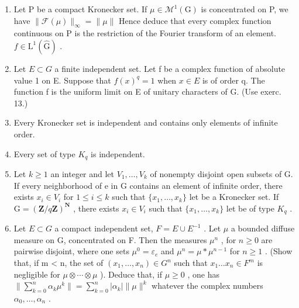 \begin{enumerate}
\def\labelenumi{\alph{enumi})}
\item
  Let P be a compact Kronecker set. If \(\mu \in \mathcal{M}^1 (\mathrm{G})\) is concentrated on P, we have \(\| \mathcal{F}(\mu)\|_{\infty} = \| \mu \|\) Hence deduce that every complex function continuous on P is the restriction of the Fourier transform of an element. \(f\in \mathrm{L}^{1}(\widehat{\mathrm{G}})\) .
\item
  Let \(E \subset G\) a finite independent set. Let f be a complex function of absolute value 1 on E. Suppose that \(f(x)^{q} = 1\) when \(x \in E\) is of order q. The function f is the uniform limit on E of unitary characters of G. (Use exerc. 13.)
\item
  Every Kronecker set is independent and contains only elements of infinite order.
\item
  Every set of type \(K_{q}\) is independent.
\item
  Let \(k \geqslant 1\) an integer and let \(V_{1}, \ldots, V_{k}\) of nonempty disjoint open subsets of G. If every neighborhood of e in G contains an element of infinite order, there exists \(x_{i} \in V_{i}\) for \(1 \leqslant i \leqslant k\) such that \(\{x_{1}, \ldots, x_{k}\}\) let be a Kronecker set. If \(\mathrm{G} = (\mathbf{Z}/q\mathbf{Z})^{\mathbf{N}}\) , there exists \(x_{i} \in V_{i}\) such that \(\{x_{1}, \ldots, x_{k}\}\) let be of type \(K_{q}\) .
\item
  Let \(E \subset G\) a compact independent set, \(F = E \cup E^{-1}\) . Let \(\mu\) a bounded diffuse measure on G, concentrated on F. Then the measures \(\mu^{n}\) , for \(n \geqslant 0\) are pairwise disjoint, where one sets \(\mu^{0} = \varepsilon_{e}\) and \(\mu^{n} = \mu * \mu^{n-1}\) for \(n \geqslant 1\) . (Show that, if m \textless{} n, the set of \((x_{1}, \ldots, x_{n}) \in G^{n}\) such that \(x_{1} \ldots x_{n} \in F^{m}\) is negligible for \(\mu \otimes \cdots \otimes \mu\) ). Deduce that, if \(\mu \geqslant 0\) , one has \(\| \sum_{k=0}^{n} \alpha_{k} \mu^{k} \| = \sum_{k=0}^{n} |\alpha_{k}| \| \mu \|^{k}\) whatever the complex numbers \(\alpha_{0}, \ldots, \alpha_{n}\) .
\end{enumerate}

